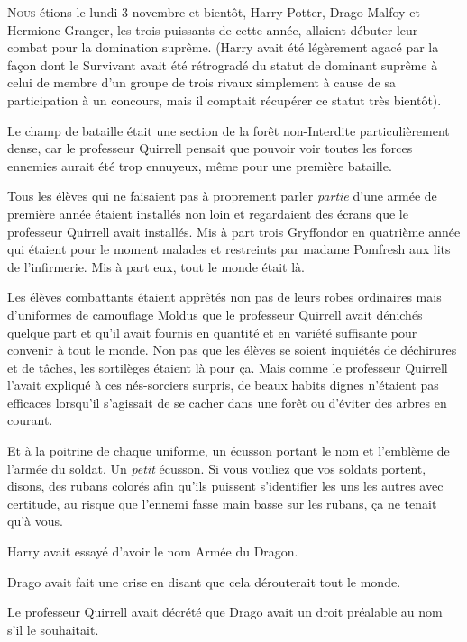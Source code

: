 
\lettrine{N}{ous} étions le lundi 3 novembre et bientôt, Harry Potter, Drago Malfoy et Hermione Granger, les trois puissants de cette année, allaient débuter leur combat pour la domination suprême.
(Harry avait été légèrement agacé par la façon dont le Survivant avait été rétrogradé du statut de dominant suprême à celui de membre d'un groupe de trois rivaux simplement à cause de sa participation à un concours, mais il comptait récupérer ce statut très bientôt).

Le champ de bataille était une section de la forêt non-Interdite particulièrement dense, car le professeur Quirrell pensait que pouvoir voir toutes les forces ennemies aurait été trop ennuyeux, même pour une première bataille.

Tous les élèves qui ne faisaient pas à proprement parler \emph{partie} d'une armée de première année étaient installés non loin et regardaient des écrans que le professeur Quirrell avait installés. Mis à part trois Gryffondor en quatrième année qui étaient pour le moment malades et restreints par madame Pomfresh aux lits de l'infirmerie. Mis à part eux, tout le monde était là.

Les élèves combattants étaient apprêtés non pas de leurs robes ordinaires mais d'uniformes de camouflage Moldus que le professeur Quirrell avait dénichés quelque part et qu'il avait fournis en quantité et en variété suffisante pour convenir à tout le monde. Non pas que les élèves se soient inquiétés de déchirures et de tâches, les sortilèges étaient là pour ça. Mais comme le professeur Quirrell l'avait expliqué à ces nés-sorciers surpris, de beaux habits dignes n'étaient pas efficaces lorsqu'il s'agissait de se cacher dans une forêt ou d'éviter des arbres en courant.

Et à la poitrine de chaque uniforme, un écusson portant le nom et l'emblème de l'armée du soldat. Un \emph{petit} écusson. Si vous vouliez que vos soldats portent, disons, des rubans colorés afin qu'ils puissent s'identifier les uns les autres avec certitude, au risque que l'ennemi fasse main basse sur les rubans, ça ne tenait qu'à vous.

Harry avait essayé d'avoir le nom Armée du Dragon.

Drago avait fait une crise en disant que cela dérouterait tout le monde.

Le professeur Quirrell avait décrété que Drago avait un droit préalable au nom s'il le souhaitait.

